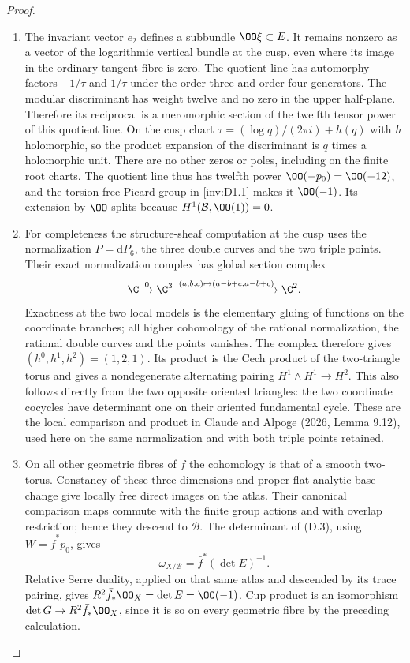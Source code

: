 \begin{proof}
\begin{enumerate}[label=\arabic*.,leftmargin=*]
\item The invariant vector $e_2$ defines a subbundle $\OO\xi\subset E$.
It remains nonzero as a vector of the logarithmic vertical bundle at
the cusp, even where its image in the ordinary tangent fibre is zero.
The quotient line has automorphy factors $-1/\tau$ and $1/\tau$ under
the order-three and order-four generators. The modular discriminant
has weight twelve and no zero in the upper half-plane. Therefore its
reciprocal is a meromorphic section of the twelfth tensor power of
this quotient line. On the cusp chart
$\tau=(\log q)/(2\pi i)+h(q)$ with $h$ holomorphic, so the product
expansion of the discriminant is $q$ times a holomorphic unit.
There are no other zeros or poles, including on the finite root
charts. The quotient line thus has twelfth power
$\OO(-p_0)=\OO(-12)$, and the torsion-free Picard group in \ref{inv:D1.1} makes
it $\OO(-1)$. Its extension by $\OO$ splits because
$H^1(\mathcal B,\OO(1))=0$.

\item For completeness the structure-sheaf computation at the cusp uses the
normalization $P=\mathrm dP_6$, the three double curves and the two
triple points. Their exact normalization complex has global section
complex
\[
 \C\xrightarrow{0}\C^3
 \xrightarrow{(a,b,c)\mapsto(a-b+c,a-b+c)}\C^2.
\]
Exactness at the two local models is the elementary gluing of functions
on the coordinate branches; all higher cohomology of the rational
normalization, the rational double curves and the points vanishes.
The complex therefore gives $(h^0,h^1,h^2)=(1,2,1)$. Its product is
the Cech product of the two-triangle torus and gives a nondegenerate
alternating pairing $H^1\wedge H^1\to H^2$. This also follows directly
from the two opposite oriented triangles: the two coordinate cocycles
have determinant one on their oriented fundamental cycle. These are
the local comparison and product in Claude and Alpoge (2026,
Lemma 9.12), used here on the same normalization and with both triple
points retained.

\item On all other geometric fibres of $\bar f$ the cohomology is that of a
smooth two-torus. Constancy of these three dimensions and proper flat
analytic base change give locally free direct images on the atlas.
Their canonical comparison maps commute with the finite group actions
and with overlap restriction; hence they descend to $\mathcal B$.
The determinant of (D.3), using $W=\bar f^*p_0$, gives
\[
 \omega_{X/\mathcal B}=\bar f^*(\det E)^{-1}.
\]
Relative Serre duality, applied on that same atlas and descended by
its trace pairing, gives $R^2\bar f_*\OO_X=\det E=\OO(-1)$.
Cup product is an isomorphism $\det G\to R^2\bar f_*\OO_X$, since it
is so on every geometric fibre by the preceding calculation.


\end{enumerate}
\end{proof}
